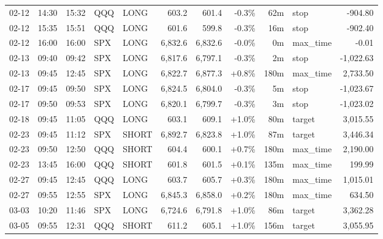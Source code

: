 \documentclass[11pt,a4paper,twoside]{article}
\begin{document}
\begin{center}
\begin{longtable}{>{\color{txtmain}}l l l l l r r r r >{\color{txtmain}}l r}
02-12 & 14:30 & 15:32 & QQQ & LONG & 603.2 & 601.4 & \textcolor{lossred}{-0.3\%} & 62m & stop & \textcolor{lossred}{-904.80} \\
02-12 & 15:35 & 15:51 & QQQ & LONG & 601.6 & 599.8 & \textcolor{lossred}{-0.3\%} & 16m & stop & \textcolor{lossred}{-902.40} \\
02-12 & 16:00 & 16:00 & SPX & LONG & 6,832.6 & 6,832.6 & \textcolor{lossred}{-0.0\%} & 0m & max\_time & \textcolor{lossred}{-0.01} \\
02-13 & 09:40 & 09:42 & SPX & LONG & 6,817.6 & 6,797.1 & \textcolor{lossred}{-0.3\%} & 2m & stop & \textcolor{lossred}{-1,022.63} \\
02-13 & 09:45 & 12:45 & SPX & LONG & 6,822.7 & 6,877.3 & \textcolor{wingreen}{+0.8\%} & 180m & max\_time & \textcolor{wingreen}{2,733.50} \\
02-17 & 09:45 & 09:50 & SPX & LONG & 6,824.5 & 6,804.0 & \textcolor{lossred}{-0.3\%} & 5m & stop & \textcolor{lossred}{-1,023.67} \\
02-17 & 09:50 & 09:53 & SPX & LONG & 6,820.1 & 6,799.7 & \textcolor{lossred}{-0.3\%} & 3m & stop & \textcolor{lossred}{-1,023.02} \\
02-18 & 09:45 & 11:05 & QQQ & LONG & 603.1 & 609.1 & \textcolor{wingreen}{+1.0\%} & 80m & target & \textcolor{wingreen}{3,015.55} \\
02-23 & 09:45 & 11:12 & SPX & SHORT & 6,892.7 & 6,823.8 & \textcolor{wingreen}{+1.0\%} & 87m & target & \textcolor{wingreen}{3,446.34} \\
02-23 & 09:50 & 12:50 & QQQ & SHORT & 604.4 & 600.1 & \textcolor{wingreen}{+0.7\%} & 180m & max\_time & \textcolor{wingreen}{2,190.00} \\
02-23 & 13:45 & 16:00 & QQQ & SHORT & 601.8 & 601.5 & \textcolor{wingreen}{+0.1\%} & 135m & max\_time & \textcolor{wingreen}{199.99} \\
02-27 & 09:45 & 12:45 & QQQ & LONG & 603.7 & 605.7 & \textcolor{wingreen}{+0.3\%} & 180m & max\_time & \textcolor{wingreen}{1,015.01} \\
02-27 & 09:55 & 12:55 & SPX & LONG & 6,845.3 & 6,858.0 & \textcolor{wingreen}{+0.2\%} & 180m & max\_time & \textcolor{wingreen}{634.50} \\
03-03 & 10:20 & 11:46 & SPX & LONG & 6,724.6 & 6,791.8 & \textcolor{wingreen}{+1.0\%} & 86m & target & \textcolor{wingreen}{3,362.28} \\
03-05 & 09:55 & 12:31 & QQQ & SHORT & 611.2 & 605.1 & \textcolor{wingreen}{+1.0\%} & 156m & target & \textcolor{wingreen}{3,055.95} \\

\end{longtable}
\end{center}
\end{document}
